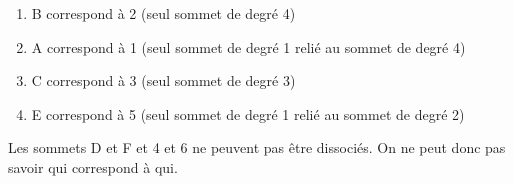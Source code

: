 \begin{Exercice}[5 minutes]
\begin{conseil}
    \end{conseil}
    \begin{solution}
        \begin{enumerate}
            \item B correspond à 2 (seul sommet de degré 4)
            \item A correspond à 1 (seul sommet de degré 1 relié au sommet de degré 4)
            \item C correspond à 3 (seul sommet de degré 3)
            \item E correspond à 5 (seul sommet de degré 1 relié au sommet de degré 2)
        \end{enumerate}
        Les sommets D et F et 4 et 6 ne peuvent pas être dissociés. On ne peut donc pas savoir qui correspond à qui.
    \end{solution}
\end{Exercice}

\newpage


